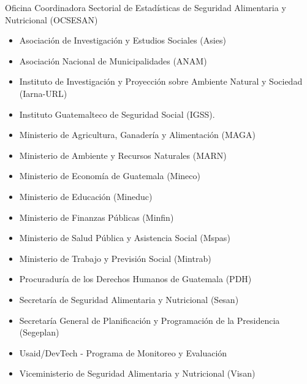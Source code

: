 


\clearpage

$\ $
\vspace{1cm}

\begin{center}
	{\Bold \LARGE Oficina Coordinadora Sectorial de Estadísticas de Seguridad Alimentaria y Nutricional (OCSESAN)}\\[2cm]
	
\begin{itemize}
	\item Asociación de Investigación y Estudios Sociales (Asies)
	\item 	Asociación Nacional de Municipalidades (ANAM)
	\item 	Instituto de Investigación y Proyección sobre Ambiente Natural y Sociedad  (Iarna-URL)
	\item 	Instituto Guatemalteco de Seguridad Social (IGSS).
	\item 	Ministerio de Agricultura, Ganadería y Alimentación (MAGA)
	\item 	Ministerio de Ambiente y Recursos Naturales (MARN)
	\item 	Ministerio de Economía de Guatemala (Mineco)
	\item 	Ministerio de Educación (Mineduc)
	\item 	Ministerio de Finanzas Públicas (Minfin)
	\item 	Ministerio de Salud Pública y Asistencia Social (Mspas)
	\item 	Ministerio de Trabajo y Previsión Social (Mintrab)
	\item 	Procuraduría de los Derechos Humanos de Guatemala (PDH)
	\item 	Secretaría de Seguridad Alimentaria y Nutricional (Sesan)
	\item 	Secretaría General de Planificación y Programación de la Presidencia (Segeplan)
	\item 	Usaid/DevTech - Programa de Monitoreo y Evaluación
	\item 	Viceministerio de Seguridad Alimentaria y Nutricional (Visan)
	
\end{itemize}	

\end{center}\setcounter{page}{0}\cleardoublepage




\clearpage

